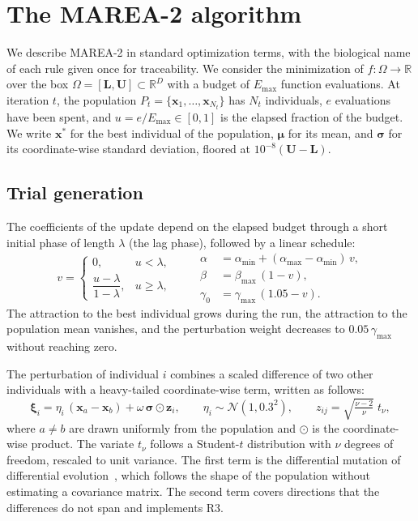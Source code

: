 \documentclass[preprint,12pt]{elsarticle}
\newcommand{\R}{\mathbb{R}}
\newcommand{\vx}{\mathbf{x}}
\newcommand{\vz}{\mathbf{z}}
\newcommand{\vm}{\boldsymbol{\mu}}
\newcommand{\vs}{\boldsymbol{\sigma}}
\newcommand{\vxi}{\boldsymbol{\xi}}
\begin{document}
\section{The MAREA-2 algorithm}
\label{sec:algorithm}

We describe MAREA-2 in standard optimization terms, with the biological name of
each rule given once for traceability. We consider the minimization of
$f : \Omega \to \R$ over the box $\Omega = [\mathbf{L}, \mathbf{U}] \subset
\R^D$ with a budget of $E_{\max}$ function evaluations. At iteration $t$, the
population $P_t = \{\vx_1, \dots, \vx_{N_t}\}$ has $N_t$ individuals, $e$
evaluations have been spent, and $u = e / E_{\max} \in [0, 1]$ is the elapsed
fraction of the budget. We write $\vx^{*}$ for the best individual of the
population, $\vm$ for its mean, and $\vs$ for its coordinate-wise standard
deviation, floored at $10^{-8}(\mathbf{U} - \mathbf{L})$.

\subsection{Trial generation}
\label{sec:trial}

The coefficients of the update depend on the elapsed budget through a short
initial phase of length $\lambda$ (the lag phase), followed by a linear
schedule:
\begin{equation}
  v = \begin{cases} 0, & u < \lambda,\\[2pt]
  \dfrac{u - \lambda}{1 - \lambda}, & u \ge \lambda, \end{cases}
  \qquad
  \begin{aligned}
    \alpha &= \alpha_{\min} + (\alpha_{\max} - \alpha_{\min})\,v,\\
    \beta  &= \beta_{\max}\,(1 - v),\\
    \gamma_0 &= \gamma_{\max}\,(1.05 - v).
  \end{aligned}
  \label{eq:coefficients}
\end{equation}
The attraction to the best individual grows during the run, the attraction to
the population mean vanishes, and the perturbation weight decreases to
$0.05\,\gamma_{\max}$ without reaching zero.

The perturbation of individual $i$ combines a scaled difference of two other
individuals with a heavy-tailed coordinate-wise term, written as follows:
\begin{equation}
  \vxi_i = \eta_i\,(\vx_a - \vx_b) + \omega\,\vs \odot \vz_i,
  \qquad \eta_i \sim \mathcal{N}(1, 0.3^2),
  \qquad z_{ij} = \sqrt{\tfrac{\nu - 2}{\nu}}\; t_{\nu},
  \label{eq:xi}
\end{equation}
where $a \neq b$ are drawn uniformly from the population and $\odot$ is the
coordinate-wise product. The variate $t_\nu$ follows a Student-$t$
distribution with $\nu$ degrees of freedom, rescaled to unit variance. The first term is the
differential mutation of differential evolution~\cite{storn1997de}, which
follows the shape of the population without estimating a covariance matrix.
The second term covers directions that the differences do not span and
implements R3.
\end{document}
